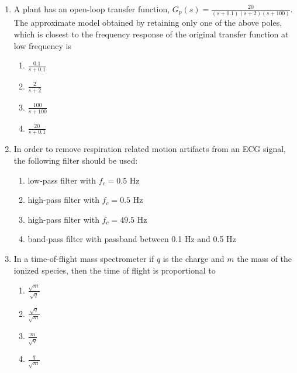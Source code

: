 \documentclass[journal,12pt,onecolumn]{IEEEtran}
\theoremstyle{remark}
\begin{document}
\begin{enumerate}
    \item A plant has an open-loop transfer function, $G_p(s) = \frac{20}{(s+0.1)(s+2)(s+100)}$. The approximate model obtained by retaining only one of the above poles, which is closest to the frequency response of the original transfer function at low frequency is
    \begin{multicols}{2}
        \begin{enumerate}
            \item $\frac{0.1}{s+0.1}$
            \item $\frac{2}{s+2}$
            \item $\frac{100}{s+100}$
            \item $\frac{20}{s+0.1}$
        \end{enumerate}
    \end{multicols}

    \item In order to remove respiration related motion artifacts from an ECG signal, the following filter should be used:
    \begin{enumerate}
        \item low-pass filter with $f_c = 0.5$ Hz
        \item high-pass filter with $f_c = 0.5$ Hz
        \item high-pass filter with $f_c = 49.5$ Hz
        \item band-pass filter with passband between 0.1 Hz and 0.5 Hz
    \end{enumerate}

    \newpage
    
    \item In a time-of-flight mass spectrometer if $q$ is the charge and $m$ the mass of the ionized species, then the time of flight is proportional to
    \begin{multicols}{2}
        \begin{enumerate}
            \item $\frac{\sqrt{m}}{\sqrt{q}}$
            \item $\frac{\sqrt{q}}{\sqrt{m}}$
            \item $\frac{m}{\sqrt{q}}$
            \item $\frac{q}{\sqrt{m}}$
        \end{enumerate}
    \end{multicols}

\end{enumerate}
\end{document}
